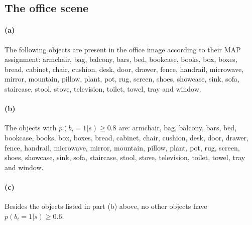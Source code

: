 \documentclass[11pt]{article}
\newcommand{\pr}[1]{\ensuremath{p(#1)}}
\begin{document}
\subsection{The office scene}

\paragraph{(a)} The following objects are present in the office image
according to their MAP assignment:
armchair, bag, balcony, bars, bed, bookcase, books, box, boxes, bread,
cabinet, chair, cushion, desk, door, drawer, fence, handrail, microwave,
mirror, mountain, pillow, plant, pot, rug, screen, shoes, showcase, sink,
sofa, staircase, stool, stove, television, toilet, towel, tray and window.


\paragraph{(b)} The objects with $\pr{b_i=1|s} \ge 0.8$ are:
armchair, bag, balcony, bars, bed, bookcase, books, box, boxes, bread,
cabinet, chair, cushion, desk, door, drawer, fence, handrail, microwave,
mirror, mountain, pillow, plant, pot, rug, screen, shoes, showcase, sink,
sofa, staircase, stool, stove, television, toilet, towel, tray and window.


\paragraph{(c)} Besides the objects listed in part (b) above, no other
objects have $\pr{b_i=1|s} \ge 0.6$.
\end{document}
